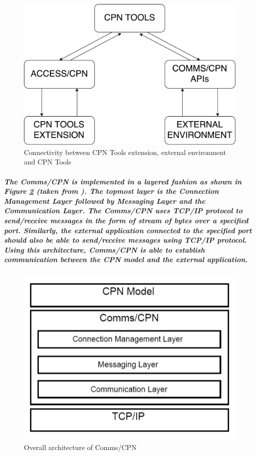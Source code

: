 \begin{figure}[!htbp]
	\centering
	\includegraphics[scale = 0.35]{DBN_Impl_CPN_Tools_Extension_External_Environment.pdf}
	\caption{Connectivity between CPN Tools extension, external environment and CPN Tools}
	\label{fig:DBN_Impl_CPN_Tools_Extension_External_Environment}
\end{figure}

\subparagraph*{\textnormal{The Comms/CPN is implemented in a layered fashion as shown in Figure \ref{fig:DBN_Impl_COMMS_CPN_Layer} (taken from \cite{gallasch2001comms}). The topmost layer is the Connection Management Layer followed by Messaging Layer and the Communication Layer. The Comms/CPN uses TCP/IP protocol to send/receive messages in the form of stream of bytes over a specified port. Similarly, the external application connected to the specified port should also be able to send/receive messages using TCP/IP protocol. Using this architecture, Comms/CPN is able to establish communication between the CPN model and the external application.}}

\begin{figure}[!htbp]
	\centering
	\includegraphics[scale = 0.35]{DBN_Impl_COMMS_CPN_Layer.pdf}
	\caption{Overall architecture of Comms/CPN}
	\label{fig:DBN_Impl_COMMS_CPN_Layer}
\end{figure}

